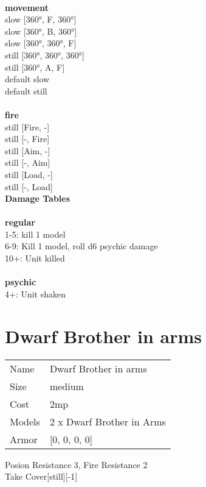 \ \\ {\bf movement } \\
slow [360°, F, 360°] \\
slow [360°, B, 360°] \\
slow [360°, 360°, F] \\
still [360°, 360°, 360°] \\
still [360°, A, F] \\
default slow \\
default still \\
\ \\ {\bf fire } \\
still [Fire, -] \\
still [-, Fire] \\
still [Aim, -] \\
still [-, Aim] \\
still [Load, -] \\
still [-, Load] \\


{\bf Damage Tables} \\
\ \\ {\bf regular } \\
1-5: kill 1 model \\
6-9: Kill 1 model, roll d6 psychic damage \\
10+: Unit killed \\
\ \\ {\bf psychic } \\
4+: Unit shaken \\










\pagebreak\pagebreak

\section{ Dwarf Brother in arms }

\begin{tabular}{ll}
  Name & Dwarf Brother in arms \\
  Size & medium\\
  Cost & 2mp\\
  Models & 2 x Dwarf Brother in Arms\\
  Armor & [0, 0, 0, 0]\\
\end{tabular}

\noindent Posion Resistance 3, Fire Resistance 2\\ 
Take Cover[still][-1]\\ 


